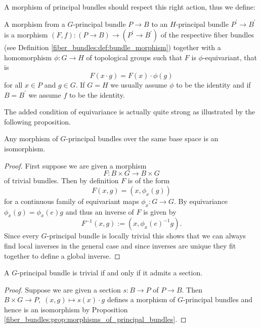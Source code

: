 A morphism of principal bundles should respect this right action, thus we define:

\begin{definition}
    A morphism from a $G$-principal bundle $P \to B$ to an $H$-principal bundle $P^\prime \to B^\prime$ is a morphism $(F,f) \colon (P \to B) \to (P^\prime \to B^\prime)$ of the respective fiber bundles (see Definition \ref{fiber_bundles:def:bundle_morphism}) together with a homomorphism $\phi \colon G \to H$ of topological groups such that $F$ is $\phi$-equivariant, that is $$F(x \cdot g) = F(x) \cdot \phi(g)$$ for all $x \in P$ and $g \in G$. If $G = H$ we usually assume $\phi$ to be the identity and if $B = B^\prime$ we assume $f$ to be the identity.
\end{definition}


The added condition of equivariance is actually quite strong as illustrated by the following proposition.

\begin{proposition}
    \label{fiber_bundles:prop:morphisms_of_principal_bundles}
    Any morphism of $G$-principal bundles over the same base space is an isomorphism.
\end{proposition}

\begin{proof}
    First suppose we are given a morphism 
    \[  
        F \colon B \times G \to B \times G
    \]
    of trivial bundles. Then by definition $F$ is of the form 
    \[
    F(x,g) = (x,\phi_x(g))
    \]
    for a continuous family of equivariant maps $\phi_x \colon G \to G$. By equivariance $\phi_x(g) = \phi_x(e) g$ and thus an inverse of $F$ is given by
    \[
    F^{-1}(x,g) := (x, \phi_x(e)^{-1} g).
    \]
    Since every $G$-principal bundle is locally trivial this shows that we can always find local inverses in the general case and since inverses are unique they fit together to define a global inverse.
\end{proof}

\begin{corollary}
    A $G$-principal bundle is trivial if and only if it admits a section.
\end{corollary}

\begin{proof}
    Suppose we are given a section $s \colon B \to P$ of $P \to B$. Then $B \times G \to P, \; (x,g) \mapsto s(x) \cdot g$ defines a morphism of $G$-principal bundles and hence is an isomorphism by Proposition \ref{fiber_bundles:prop:morphisms_of_principal_bundles}.
\end{proof}


